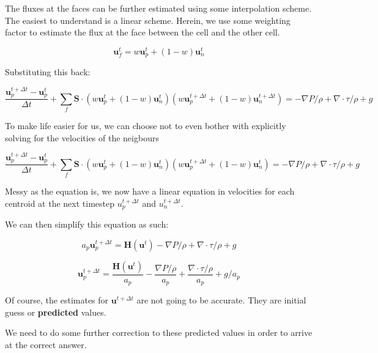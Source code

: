 \documentclass[masters]{ucbthesis}
\renewcommand{\_}{\kern-1.5pt\textunderscore\kern-1.5pt}
\begin{document}
The fluxes at the faces can be further estimated using some interpolation 
scheme. The easiest to understand is a linear scheme. Herein, we use some 
weighting factor to estimate the flux at the face between the cell 
and the other cell.

$$ \textbf{u}_f^t = w \textbf{u}_p^t + (1-w) \textbf{u}_{n}^t  $$

Substituting this back:

\begin{equation}
	\frac{\textbf{u}^{t+ \Delta t}_p - \textbf{u}^t_p}{\Delta t} 
	+ \sum_f \mathbf{S}\cdot (w \textbf{u}_p^t + (1-w) \textbf{u}_{n}^t) 
	(w \textbf{u}_p^{t + \Delta t} + (1-w) \textbf{u}_{n}^{t + \Delta t})
	= - \nabla P/\rho
	+ \nabla \cdot \tau /\rho
	+ g
\end{equation}

To make life easier for us, we can choose not to even bother with 
explicitly solving for the velocities of the neigbours

\begin{equation}
	\frac{\textbf{u}^{t+ \Delta t}_p - \textbf{u}^t_p}{\Delta t} 
	+ \sum_f \mathbf{S}\cdot ( w \textbf{u}_p^t + (1-w) \textbf{u}_{n}^t) 
	(w \textbf{u}_p^{t + \Delta t} + (1-w) \textbf{u}_{n}^{t })
	= 
	- \nabla P/\rho
	+ \nabla \cdot \tau /\rho
	+ g
\end{equation}

Messy as the equation is, we now have a linear equation in velocities 
for each centroid at the next timestep $u^{t + \Delta t}_p$ 
and $u^{t + \Delta t}_n$.

We can then simplify this equation as such:


\begin{equation}
	a_p \textbf{u}_p^{t + \Delta t} = \textbf{H}(\textbf{u}^t)
	- \nabla P/\rho
	+ \nabla \cdot \tau /\rho
	+ g
\end{equation}

\begin{equation}
	\textbf{u}_p^{t + \Delta t} = \frac{\textbf{H}(\textbf{u}^t)}{a_p}
	- \frac{\nabla P/\rho}{a_p}
	+ \frac{\nabla \cdot \tau /\rho}{a_p}
	+ g/a_p
\end{equation}


Of course, the estimates for $\mathbf{u}^{t + \Delta t}$ are not going to 
be accurate. They are initial guess or \textbf{predicted} values.

We need to do some further correction to these predicted values in order 
to arrive at the correct answer.
\end{document}
